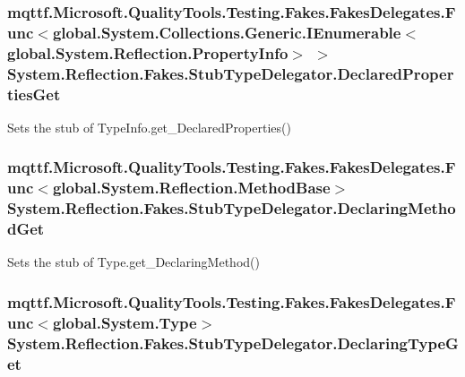 \hypertarget{class_system_1_1_reflection_1_1_fakes_1_1_stub_type_delegator_a724eac8e024efafe8e9478b6e4594990}{
\subsubsection[{Declared\-Properties\-Get}]{\setlength{\rightskip}{0pt plus 5cm}mqttf.\-Microsoft.\-Quality\-Tools.\-Testing.\-Fakes.\-Fakes\-Delegates.\-Func$<$global.\-System.\-Collections.\-Generic.\-I\-Enumerable$<$global.\-System.\-Reflection.\-Property\-Info$>$ $>$ System.\-Reflection.\-Fakes.\-Stub\-Type\-Delegator.\-Declared\-Properties\-Get}}\label{class_system_1_1_reflection_1_1_fakes_1_1_stub_type_delegator_a724eac8e024efafe8e9478b6e4594990}


Sets the stub of Type\-Info.\-get\-\_\-\-Declared\-Properties()

\hypertarget{class_system_1_1_reflection_1_1_fakes_1_1_stub_type_delegator_a7817f8b00b04b63b8d84b8dfb382f245}{
\subsubsection[{Declaring\-Method\-Get}]{\setlength{\rightskip}{0pt plus 5cm}mqttf.\-Microsoft.\-Quality\-Tools.\-Testing.\-Fakes.\-Fakes\-Delegates.\-Func$<$global.\-System.\-Reflection.\-Method\-Base$>$ System.\-Reflection.\-Fakes.\-Stub\-Type\-Delegator.\-Declaring\-Method\-Get}}\label{class_system_1_1_reflection_1_1_fakes_1_1_stub_type_delegator_a7817f8b00b04b63b8d84b8dfb382f245}


Sets the stub of Type.\-get\-\_\-\-Declaring\-Method()

\hypertarget{class_system_1_1_reflection_1_1_fakes_1_1_stub_type_delegator_accaa6566e7850bc6568947198e2e7a97}{
\subsubsection[{Declaring\-Type\-Get}]{\setlength{\rightskip}{0pt plus 5cm}mqttf.\-Microsoft.\-Quality\-Tools.\-Testing.\-Fakes.\-Fakes\-Delegates.\-Func$<$global.\-System.\-Type$>$ System.\-Reflection.\-Fakes.\-Stub\-Type\-Delegator.\-Declaring\-Type\-Get}}\label{class_system_1_1_reflection_1_1_fakes_1_1_stub_type_delegator_accaa6566e7850bc6568947198e2e7a97}



